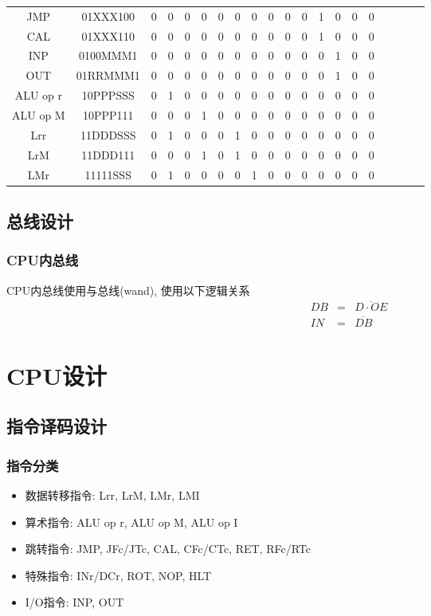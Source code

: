 \documentclass[10pt]{book}
\begin{document}
\begin{longtable}{|c|c|c|c|c|c|c|c|c|c|c|c|c|c|c|c|c|c|c|c|}
JMP		& 01XXX100 &  0 & 0   & 0   & 0   &  0 & 0   & 0   & 0   &  0   & 0   & 1  & 0  & 0   & 0 \\
CAL		& 01XXX110 &  0 & 0   & 0   & 0   &  0 & 0   & 0   & 0   &  0   & 0   & 1  & 0  & 0   & 0 \\
INP		& 0100MMM1 &  0 & 0   & 0   & 0   &  0 & 0   & 0   & 0   &  0   & 0   & 0  & 1  & 0   & 0 \\
OUT		& 01RRMMM1 &  0 & 0   & 0   & 0   &  0 & 0   & 0   & 0   &  0   & 0   & 0  & 1  & 0   & 0 \\
\hline
ALU op r 	& 10PPPSSS &  0 & 1   & 0   & 0   &  0 & 0   & 0   & 0   &  0   & 0   & 0  & 0  & 0   & 0 \\
ALU op M 	& 10PPP111 &  0 & 0   & 0   & 1   &  0 & 0   & 0   & 0   &  0   & 0   & 0  & 0  & 0   & 0 \\
\hline
Lrr		& 11DDDSSS &  0 & 1   & 0   & 0   &  0 & 1   & 0   & 0   &  0   & 0   & 0  & 0  & 0   & 0 \\
LrM		& 11DDD111 &  0 & 0   & 0   & 1   &  0 & 1   & 0   & 0   &  0   & 0   & 0  & 0  & 0   & 0 \\
LMr		& 11111SSS &  0 & 1   & 0   & 0   &  0 & 0   & 1   & 0   &  0   & 0   & 0  & 0  & 0   & 0 \\
\end{longtable}

\section{总线设计}
\subsection{CPU内总线}
CPU内总线使用与总线(wand), 使用以下逻辑关系
\begin{eqnarray*}
DB &=& \overline{D\cdot OE} \\
IN &=& \overline{DB}
\end{eqnarray*}


\chapter{CPU设计}
\section{指令译码设计}
\subsection{指令分类}
\begin{itemize}
  \item 数据转移指令: Lrr, LrM, LMr, LMI
  \item 算术指令: ALU op r, ALU op M, ALU op I
  \item 跳转指令: JMP, JFc/JTc, CAL, CFc/CTc, RET, RFc/RTc
  \item 特殊指令: INr/DCr, ROT, NOP, HLT
  \item I/O指令: INP, OUT
\end{itemize}
\end{document}
